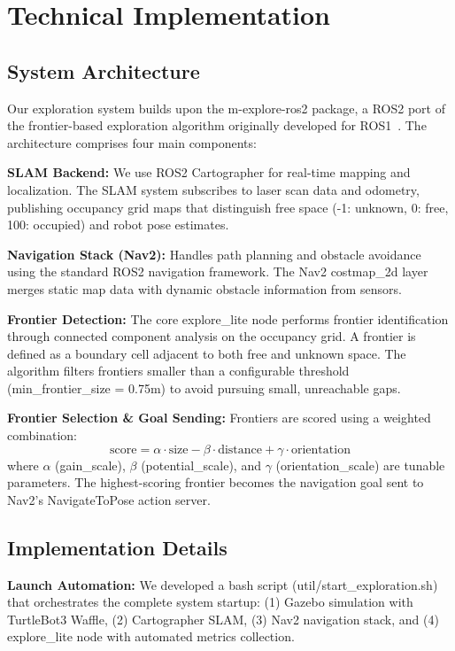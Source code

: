 \documentclass[conference]{IEEEtran}
\begin{document}
\section{Technical Implementation}

\subsection{System Architecture}

Our exploration system builds upon the m-explore-ros2 package, a ROS2 port of the frontier-based exploration algorithm originally developed for ROS1~\cite{horner2016exploration}. The architecture comprises four main components:

\textbf{SLAM Backend:} We use ROS2 Cartographer for real-time mapping and localization. The SLAM system subscribes to laser scan data and odometry, publishing occupancy grid maps that distinguish free space (-1: unknown, 0: free, 100: occupied) and robot pose estimates.

\textbf{Navigation Stack (Nav2):} Handles path planning and obstacle avoidance using the standard ROS2 navigation framework. The Nav2 costmap\_2d layer merges static map data with dynamic obstacle information from sensors.

\textbf{Frontier Detection:} The core explore\_lite node performs frontier identification through connected component analysis on the occupancy grid. A frontier is defined as a boundary cell adjacent to both free and unknown space. The algorithm filters frontiers smaller than a configurable threshold (min\_frontier\_size = 0.75m) to avoid pursuing small, unreachable gaps.

\textbf{Frontier Selection \& Goal Sending:} Frontiers are scored using a weighted combination:
\begin{equation}
    \text{score} = \alpha \cdot \text{size} - \beta \cdot \text{distance} + \gamma \cdot \text{orientation}
\end{equation}
where $\alpha$ (gain\_scale), $\beta$ (potential\_scale), and $\gamma$ (orientation\_scale) are tunable parameters. The highest-scoring frontier becomes the navigation goal sent to Nav2's NavigateToPose action server.

\subsection{Implementation Details}

\textbf{Launch Automation:} We developed a bash script (util/start\_exploration.sh) that orchestrates the complete system startup: (1) Gazebo simulation with TurtleBot3 Waffle, (2) Cartographer SLAM, (3) Nav2 navigation stack, and (4) explore\_lite node with automated metrics collection.
\end{document}

